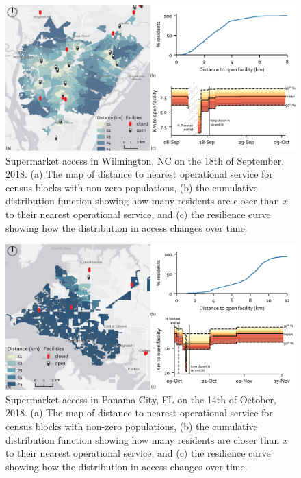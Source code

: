 \documentclass[9pt,twoside,lineno]{pnas-new}
\begin{document}
\begin{figure}
    \centering
    \includegraphics[width=\linewidth]{report/fig/FigS_Wilm_supermarket.png}
    \caption{
    Supermarket access in Wilmington, NC on the 18th of September, 2018. (a) The map of distance to nearest operational service for census blocks with non-zero populations, (b) the cumulative distribution function showing how many residents are closer than $x$ to their nearest operational service, and (c) the resilience curve showing how the distribution in access changes over time.
    }
    \label{figS:nc_grocery}
\end{figure}

\begin{figure}
    \centering
    \includegraphics[width=\linewidth]{report/fig/FigS_fl_supermarket.png}
    \caption{
    Supermarket access in Panama City, FL on the 14th of October, 2018. (a) The map of distance to nearest operational service for census blocks with non-zero populations, (b) the cumulative distribution function showing how many residents are closer than $x$ to their nearest operational service, and (c) the resilience curve showing how the distribution in access changes over time.
    }
    \label{figS:fl_grocery}
\end{figure}
\end{document}
